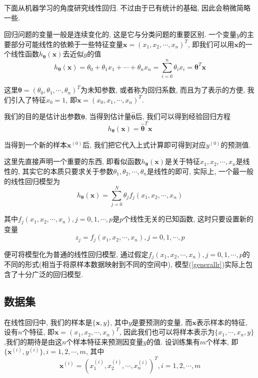\documentclass[a4paper,UTF8]{ctexart}
\theoremstyle{plain} \newtheorem{theorem}{定理}[section]
\theoremstyle{plain} \newtheorem{definition}{定义}[section]
\theoremstyle{plain} \newtheorem{lemma}{引理}[section]
\theoremstyle{plain} \newtheorem{proposition}{命题}[section]
\theoremstyle{plain} \newtheorem{example}{例}[section]
\theoremstyle{plain} \newtheorem{remark}{注}[section]
\theoremstyle{plain} \newtheorem{corollary}{推论}[section]
\begin{document}
下面从机器学习的角度研究线性回归. 不过由于已有统计的基础, 因此会稍微简略一些.

回归问题的变量一般是连续变化的, 这是它与分类问题的重要区别. 一个变量$y$的主要部分可能线性的依赖于一些特征变量$\bm{x} = (x_{1}, x_{2}, \cdots, x_{n})^{T}$, 即我们可以用$\bm{x}$的一个线性函数$h_{\bm{\theta}}(\bm{x})$去近似$y$的值
\begin{equation*}
h_{\bm{\theta}}(\bm{x}) = \theta_{0} + \theta_{1} x_{1} + \cdots + \theta_{n} x_{n} = \sum_{i=0}^{n} \theta_{i} x_{i} = \bm{\theta}^{T} \bm{x} 
\end{equation*}

这里$\bm{\theta} = (\theta_0, \theta_1, \cdots, \theta_n)^{T}$为未知参数, 或者称为回归系数, 而且为了表示的方便, 我们引入了特征$x_{0} = 1$, 即$\bm{x} = (x_0, x_1, \cdots, x_n)^{T}$.

我们的目的是估计出参数$\bm{\theta}$, 当得到估计量$\hat{\bm{\theta}}$后, 我们可以得到经验回归方程
\begin{equation*}
h_{\bm{\theta}}(\bm{x}) = \hat{\bm{\theta}}^{T} \bm{x}
\end{equation*}

当得到一个新的样本$\bm{x}^{(0)}$后, 我们把它代入上式计算即可得到对应$y^{(0)}$的预测值.

这里先直接声明一个重要的东西, 即看似函数$h_{\bm{\theta}}(\bm{x})$是关于特征$x_1, x_2, \cdots, x_n$是线性的, 其实它的本质只要求关于参数$\theta_{1}, \theta_{2}, \cdots, \theta_{n}$是线性的即可, 实际上, 一个最一般的线性回归模型为
\begin{equation}\label{generallr}
h_{\bm{\theta}}(\bm{x}) = \sum_{j=0}^{N} \theta_{j} f_{j} (x_1, x_2, \cdots, x_n)
\end{equation}

其中$f_{j} (x_1, x_2, \cdots, x_n), j = 0, 1, \cdots, p$是$p$个线性无关的已知函数, 这时只要设置新的变量
\begin{equation*}
z_{j} = f_{j} (x_1, x_2, \cdots, x_n), j = 0, 1, \cdots, p
\end{equation*}

便可将模型化为普通的线性回归模型, 通过假定$f_{j} (x_1, x_2, \cdots, x_n), j = 0, 1, \cdots, p$的不同的形式(相当于将原样本数据映射到不同的空间中), 模型(\ref{generallr})实际上包含了十分广泛的回归模型.


\subsection{数据集}
在线性回归中, 我们的样本是$\{ \bm{x}, y \}$, 其中$y$是要预测的变量, 而$\bm{x}$表示样本的特征, 设有$n$个特征, 即$\bm{x} = (x_{1}, x_{2}, \cdots, x_{n})^{T}$, 因此我们也可以将样本表示为$\{x_{1},\cdots,x_{n},y\}$,我们的期待是由这$n$个样本特征来预测因变量$y$的值. 设训练集有$m$个样本, 即$\{ \bm{x}^{(i)}, y^{(i)} \}, i = 1, 2, \cdots, m$, 其中
\begin{equation*}
\bm{x}^{(i)} = (x_{1}^{(i)}, x_{2}^{(i)}, \cdots, x_{n}^{(i)})^{T},i = 1, 2, \cdots, m
\end{equation*}
\end{document}
